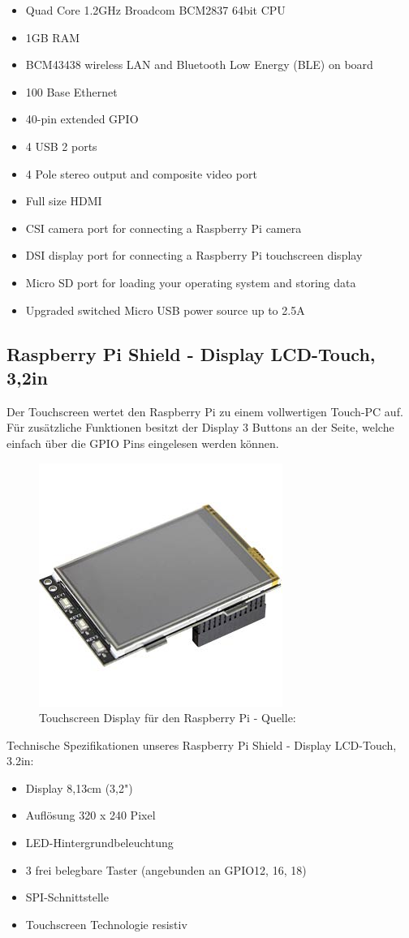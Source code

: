 \documentclass[a4paper,11pt,singlespacing]{article}
\begin{document}
				\begin{itemize}
					\item Quad Core 1.2GHz Broadcom BCM2837 64bit CPU
					\item 1GB RAM
					\item BCM43438 wireless LAN and Bluetooth Low Energy (BLE) on board
					\item 100 Base Ethernet
					\item 40-pin extended GPIO
					\item 4 USB 2 ports
					\item 4 Pole stereo output and composite video port
					\item Full size HDMI
					\item CSI camera port for connecting a Raspberry Pi camera
					\item DSI display port for connecting a Raspberry Pi touchscreen display
					\item Micro SD port for loading your operating system and storing data
					\item Upgraded switched Micro USB power source up to 2.5A
				\end{itemize}
			\subsection{Raspberry Pi Shield - Display LCD-Touch, 3,2in}
				Der Touchscreen wertet den Raspberry Pi zu einem vollwertigen Touch-PC auf. Für zusätzliche Funktionen besitzt der Display 3 Buttons an der Seite, welche einfach über die GPIO Pins eingelesen werden können.
				\begin{figure}[H]
					\centering
					\includegraphics[scale=0.5]{touch_display}
					\caption{Touchscreen Display für den Raspberry Pi - Quelle: \cite{Picture_touchdisplay}}
					\label{touchdisplay}
				\end{figure}
				Technische Spezifikationen unseres Raspberry Pi Shield - Display LCD-Touch, 3.2in:
				\begin{itemize}
					\item Display 8,13cm (3,2")
					\item Auflösung 320 x 240 Pixel
					\item LED-Hintergrundbeleuchtung
					\item 3 frei belegbare Taster (angebunden an GPIO12, 16, 18)
					\item SPI-Schnittstelle
					\item Touchscreen Technologie resistiv
				\end{itemize}
\end{document}
